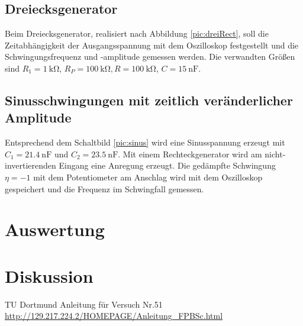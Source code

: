 \subsection{Dreiecksgenerator}
Beim Dreiecksgenerator, realisiert nach Abbildung \ref{pic:dreiRect},
soll die Zeitabhängigkeit der Ausgangsspannung mit dem Oszilloskop
festgestellt und die Schwingungsfrequenz und -amplitude gemessen werden.
Die verwandten Größen sind $R_1 = \SI{1}{\kilo\ohm}$, $R_P = \SI{100}{\kilo\ohm},
R= \SI{100}{\kilo\ohm}$, $C = \SI{15}{\nano\farad}$.

\subsection{Sinusschwingungen mit zeitlich veränderlicher Amplitude}
Entsprechend dem Schaltbild \ref{pic:sinus} wird eine Sinusspannung
erzeugt mit $C_1 = \SI{21,4}{\nano\farad}$ und $C_2  = \SI{23,5}{\nano\farad}$.
Mit einem Rechteckgenerator wird am nicht-invertierenden Eingang
eine Anregung erzeugt. Die gedämpfte Schwingung $\eta = -1$ mit dem
Potentiometer am Anschlag wird mit dem Oszilloskop gespeichert und
die Frequenz im Schwingfall gemessen.



\section{Auswertung}
\section{Diskussion}


\newpage
 \begin{thebibliography}{WissOnl}
 	 TU Dortmund Anleitung für Versuch Nr.51 \url{http://129.217.224.2/HOMEPAGE/Anleitung_FPBSc.html}
 	\end{thebibliography}




